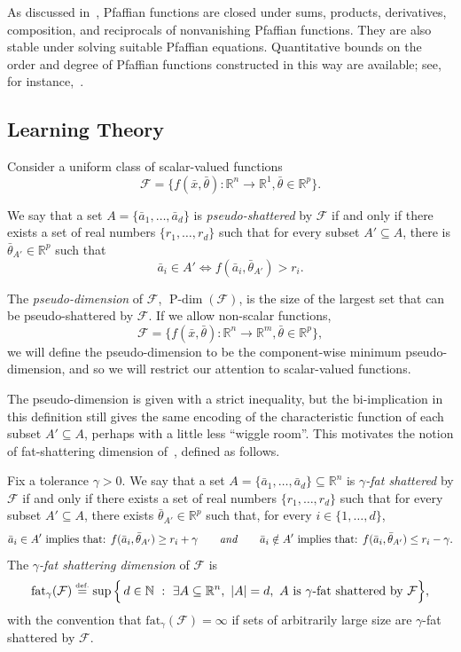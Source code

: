 \documentclass{article}
\newcommand{\eqdef}{\ensuremath{\stackrel{\mbox{\upshape\tiny def.}}{=}}}
\theoremstyle{plain}
\theoremstyle{definition}
\theoremstyle{remark}
\newcommand{\reals}{\mathbb{R}}
\newcommand{\calF}{\mathcal{F}}
\DeclareMathOperator{\pdim}{P\text{-}\dim}
\newcommand{\fat}{\mathrm{fat}}
\theoremstyle{plain}
\numberwithin{thm}{section}
\theoremstyle{definition}
\numberwithin{equation}{section}
\begin{document}
As discussed in~\cite[page 111]{Khovanskii_Fewnomials}, Pfaffian functions are closed under sums, products, derivatives, composition, and reciprocals of nonvanishing Pfaffian functions.  They are also stable under solving suitable Pfaffian equations.  Quantitative bounds on the order and degree of Pfaffian functions constructed in this way are available; see, for instance,~\citep[Lemmas 2.4 and 2.5]{GabrielovVorobjov_NoetherianPfaffianComplexity_2004}.

\subsection{Learning Theory}
\label{s:MoreBackground__ss:LearningTheory}


Consider a uniform class of scalar-valued functions 
\[\calF=\{f(\bar{x},\bar{\theta}):\reals^n\rightarrow\reals ^1, \bar{\theta}\in \reals^p\}.\]

We say that a set $A=\{\bar a_1,\ldots, \bar a_d\}$ is \emph{pseudo-shattered} by $\calF$ if and only if there exists a set of real numbers $\{r_1,\ldots, r_d\}$ such that for every subset $A'\subseteq A$, there is $\bar{\theta}_{A'}\in \reals^p$ such that 
\[\bar{a}_i\in A' \Leftrightarrow  f(\bar{a}_i,\bar{\theta}_{A'})>r_i.\]

The \emph{pseudo-dimension} of $\calF$, $\pdim(\calF)$, is the size of the largest set that can be pseudo-shattered by $\calF$. If we allow non-scalar functions,
\[\calF=\{f(\bar{x},\bar{\theta}):\reals^n\rightarrow\reals ^m, \bar{\theta}\in \reals^p\},\]
we will define the pseudo-dimension to be the component-wise minimum pseudo-dimension, and so we will restrict our attention to scalar-valued functions. 


The pseudo-dimension is given with a strict inequality, but the bi-implication in this definition still gives the same encoding of the characteristic function of each subset $A'\subseteq A$, perhaps with a little less ``wiggle room''.  This motivates the notion of fat-shattering dimension of~\cite{DBLP:journals/jcss/KearnsS94}, defined as follows.

Fix a tolerance $\gamma>0$.  We say that a set $A=\{\bar a_1,\ldots,\bar a_d\}\subseteq \reals^n$
is \emph{$\gamma$-fat shattered} by $\calF$ if and only if there exists a set of
real numbers $\{r_1,\ldots,r_d\}$ such that for every subset $A'\subseteq A$,
there exists $\bar{\theta}_{A'}\in \reals^p$ such that, for every
$i\in\{1,\ldots,d\}$,
\[
\bar a_i\in A'
\mbox{ implies that: }
f(\bar a_i,\bar\theta_{A'}) \ge r_i+\gamma
\qquad\text{\textit{and}}\qquad
\bar a_i\notin A'
\mbox{ implies that: }
f(\bar a_i,\bar\theta_{A'}) \le r_i-\gamma.
\]
\noindent
The \emph{$\gamma$-fat shattering dimension} of $\calF$ is
\[
\fat_{\gamma}(\calF)
\eqdef
\sup\Big\{\, d\in\mathbb{N}\ :\ \exists A\subseteq \reals^n,\ |A|=d,\
A\ \text{is $\gamma$-fat shattered by }\calF \Big\},
\]
with the convention that $\fat_{\gamma}(\calF)=\infty$ if sets of arbitrarily
large size are $\gamma$-fat shattered by $\calF$.
\end{document}

